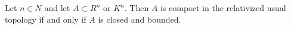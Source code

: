 Let $n \in N$ and let $A \subset R^n$ or $K^n$. Then $A$ is compact in the relativized usual topology if and only if $A$ is closed and bounded.